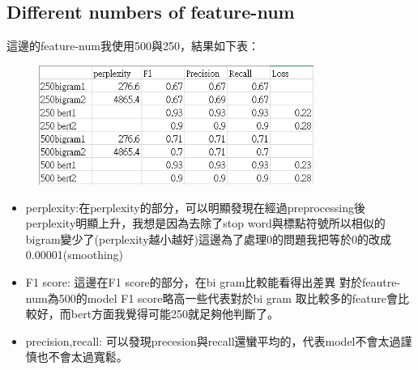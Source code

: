 \documentclass[12,a4paper]{article}
\begin{document}
\subsection{Different numbers of feature-num}
這邊的feature-num我使用500與250，結果如下表：
\begin{figure}[!ht]
\centering
\includegraphics[width=0.8\textwidth]{pic/sheet1.png}
\end{figure}
\FloatBarrier
\begin{itemize}
    \item perplexity:在perplexity的部分，可以明顯發現在經過preprocessing後perplexity明顯上升，我想是因為去除了stop word與標點符號所以相似的bigram變少了(perplexity越小越好)這邊為了處理0的問題我把等於0的改成0.00001(smoothing)
    \item F1 score: 這邊在F1 score的部分，在bi gram比較能看得出差異 對於feautre-num為500的model F1 score略高一些代表對於bi gram 取比較多的feature會比較好，而bert方面我覺得可能250就足夠他判斷了。
    \item precision,recall: 可以發現precesion與recall還蠻平均的，代表model不會太過謹慎也不會太過寬鬆。
\end{itemize}
\end{document}
